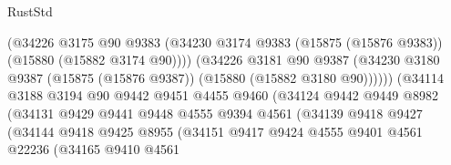 \begin{lexlean}{RustStd}
\begin{coremodule}
                                      (@34226
                                        @3175
                                        @90
                                        @9383
                                        (@34230
                                          @3174
                                          @9383
                                          (@15875 (@15876 @9383))
                                          (@15880 (@15882 @3174 @90))))
                                      (@34226
                                        @3181
                                        @90
                                        @9387
                                        (@34230
                                          @3180
                                          @9387
                                          (@15875 (@15876 @9387))
                                          (@15880 (@15882 @3180 @90))))))
                                  (@34114
                                    @3188
                                    @3194
                                    @90
                                    @9442
                                    @9451
                                    @4455
                                    @9460
                                    (@34124
                                      @9442
                                      @9449
                                      @8982
                                      (@34131
                                        @9429
                                        @9441
                                        @9448
                                        @4555
                                        @9394
                                        @4561
                                        (@34139
                                          @9418
                                          @9427
                                          (@34144
                                            @9418
                                            @9425
                                            @8955
                                            (@34151
                                              @9417
                                              @9424
                                              @4555
                                              @9401
                                              @4561
                                              @22236
                                              (@34165
                                                @9410
                                                @4561

\end{coremodule}
\end{lexlean}
